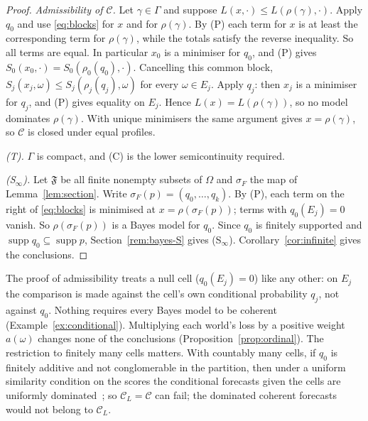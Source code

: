 \documentclass[11pt]{article}
\theoremstyle{definition}
\theoremstyle{remark}
\newcommand{\C}{\mathcal C}
\newcommand{\F}{\mathfrak F}
\newcommand{\supp}{\operatorname{supp}}
\begin{document}
\begin{proof}
\emph{Admissibility of $\C$.} Let $\gamma\in\Gamma$ and suppose $L(x,\cdot)\le L(\rho(\gamma),\cdot)$. Apply $q_0$ and use \eqref{eq:blocks} for $x$ and for $\rho(\gamma)$. By (P) each term for $x$ is at least the corresponding term for $\rho(\gamma)$, while the totals satisfy the reverse inequality. So all terms are equal. In particular $x_0$ is a minimiser for $q_0$, and (P) gives $S_0(x_0,\cdot)=S_0(\rho_0(q_0),\cdot)$. Cancelling this common block, $S_j(x_j,\omega)\le S_j(\rho_j(q_j),\omega)$ for every $\omega\in E_j$. Apply $q_j$: then $x_j$ is a minimiser for $q_j$, and (P) gives equality on $E_j$. Hence $L(x)=L(\rho(\gamma))$, so no model dominates $\rho(\gamma)$. With unique minimisers the same argument gives $x=\rho(\gamma)$, so $\C$ is closed under equal profiles.

\emph{(T).} $\Gamma$ is compact, and (C) is the lower semicontinuity required.

\emph{(S$_\infty$).} Let $\F$ be all finite nonempty subsets of $\Omega$ and $\sigma_F$ the map of Lemma~\ref{lem:section}. Write $\sigma_F(p)=(q_0,\dots,q_k)$. By (P), each term on the right of \eqref{eq:blocks} is minimised at $x=\rho(\sigma_F(p))$; terms with $q_0(E_j)=0$ vanish. So $\rho(\sigma_F(p))$ is a Bayes model for $q_0$. Since $q_0$ is finitely supported and $\supp q_0\subseteq\supp p$, Section~\ref{rem:bayes-S} gives (S$_\infty$). Corollary~\ref{cor:infinite} gives the conclusions.
\end{proof}
The proof of admissibility treats a null cell ($q_0(E_j)=0$) like any other: on $E_j$ the comparison is made against the cell's own conditional probability $q_j$, not against $q_0$. Nothing requires every Bayes model to be coherent (Example~\ref{ex:conditional}). Multiplying each world's loss by a positive weight $a(\omega)$ changes none of the conclusions (Proposition~\ref{prop:ordinal}). The restriction to finitely many cells matters. With countably many cells, if $q_0$ is finitely additive and not conglomerable in the partition, then under a uniform similarity condition on the scores the conditional forecasts given the cells are uniformly dominated~\cite[Theorem~2]{SSK14}; so $\C_L=\C$ can fail; the dominated coherent forecasts would not belong to $\C_L$.
\end{document}
